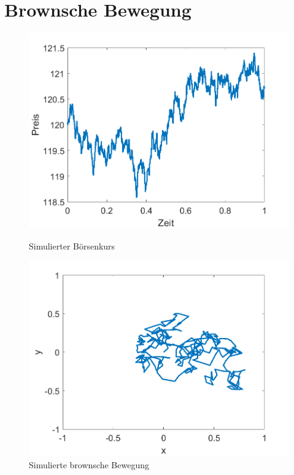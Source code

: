 %
%
%
%

\section{Brownsche Bewegung\label{brown:BrownBewegung}}

\begin{figure}
	\centering
	\begin{minipage}{0.45\textwidth}
		\centering
		\includegraphics[width=\linewidth]{papers/brown/images/boersenKurs-simuliert.png}
		\caption{Simulierter Börsenkurs}
		\label{brown:1Dbrownian}
	\end{minipage}
	\hspace{0.05\linewidth}
	\begin{minipage}{0.45\textwidth}
		\centering
		\includegraphics[width=\linewidth]{papers/brown/images/brownscheBewegung-simuliert.png}
		\caption{Simulierte brownsche Bewegung}
		\label{brown:2Dbrownian}
	\end{minipage}
\end{figure}

